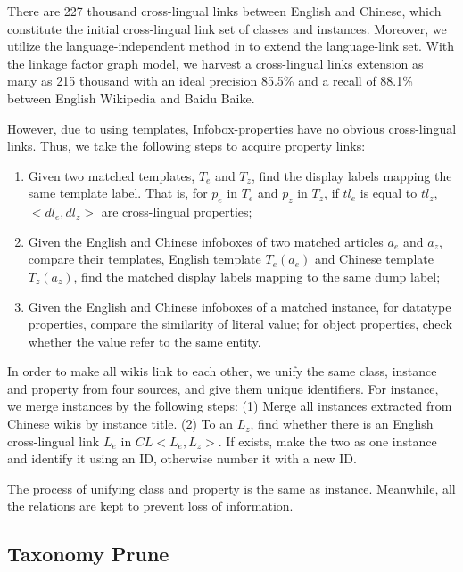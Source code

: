 \documentclass[runningheads,a4paper]{llncs}
\begin{document}
There are 227 thousand cross-lingual links between English and Chinese, which constitute the initial cross-lingual link set of classes and instances. Moreover, we utilize the language-independent method in \cite{wang2012cross} to extend the language-link set. With the linkage factor graph model, we harvest a cross-lingual links extension as many as 215 thousand with an ideal precision 85.5\% and a recall of 88.1\% between English Wikipedia and Baidu Baike.

However, due to using templates, Infobox-properties have no obvious cross-lingual links. Thus, we take the following steps to acquire property links:
\begin{enumerate}
    \item Given two matched templates, $T_{e}$ and $T_{z}$, find the display labels mapping the same template label. That is, for $p_{e}$ in $T_{e}$ and $p_{z}$ in $T_{z}$, if $tl_{e}$ is equal to $tl_{z}$, $<dl_{e},dl_{z}>$ are cross-lingual properties;
    \item Given the English and Chinese infoboxes of two matched articles $a_{e}$ and $a_{z}$, compare their templates, English template $T_{e}(a_{e})$ and Chinese template $T_{z}(a_{z})$, find the matched display labels mapping to the same dump label;
    \item Given the English and Chinese infoboxes of a matched instance, for datatype properties, compare the similarity of literal value; for object properties, check whether the value refer to the same entity.
\end{enumerate}

In order to make all wikis link to each other, we unify the same class, instance and property from four sources, and give them unique identifiers. For instance, we merge instances by the following steps: (1) Merge all instances extracted from Chinese wikis by instance title. (2) To an $L_{z}$, find whether there is an English cross-lingual link $L_{e}$ in $CL<L_{e}, L_{z}>$. If exists, make the two as one instance and identify it using an ID, otherwise number it with a new ID.

The process of unifying class and property is the same as instance. Meanwhile, all the relations are kept to prevent loss of information.

\subsection{Taxonomy Prune}
\end{document}
